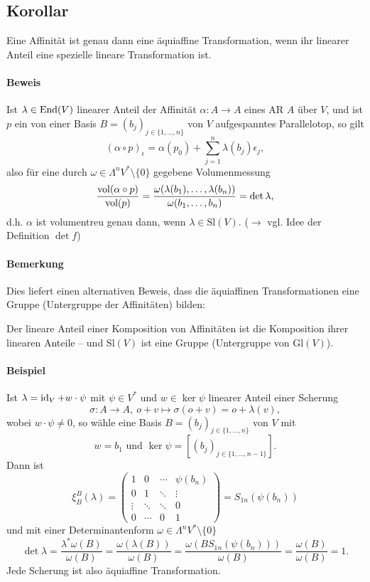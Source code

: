  \subsection{Korollar}
 	Eine Affinität ist genau dann eine äquiaffine Transformation, wenn ihr linearer Anteil eine spezielle lineare Transformation ist.
 	\paragraph{Beweis}
 		Ist $ \lambda \in \operatorname{End}(V) $ linearer Anteil der Affinität $ \alpha:A\to A $ eines AR $ A  $ über $ V $, und ist $ p $ ein von einer Basis $ B=(b_j)_{j\in \{1,\dots,n\}} $ von $ V $ aufgespanntes Parallelotop, so gilt
 		\[
 			(\alpha\circ p)_\epsilon = \alpha(p_0)+\sum_{j=1}^{n}\lambda(b_j)\epsilon_j,
 		\]
 		also für eine durch $ \omega\in \Lambda^nV^*\setminus \{0\} $ gegebene Volumenmessung
 		\[
 			\frac{\operatorname{vol}(\alpha\circ p)}{\operatorname{vol}(p)} = \frac{\omega(\lambda(b_1),\dots,\lambda(b_n))}{\omega(b_1,\dots,b_n)}=\det \lambda,
 		\]
 		d.h. $ \alpha $ ist volumentreu genau dann, wenn $ \lambda \in \mathrm{Sl}(V) $. ($ \rightarrow $ vgl. Idee der Definition $ \det f $)
 	\paragraph{Bemerkung}
 		Dies liefert einen alternativen Beweis, dass die äquiaffinen Transformationen eine Gruppe (Untergruppe der Affinitäten) bilden:

 		Der lineare Anteil einer Komposition von Affinitäten ist die Komposition ihrer linearen Anteile -- und $ \mathrm{Sl}(V) $ ist eine Gruppe (Untergruppe von $ \mathrm{Gl}(V) $).
 	\paragraph{Beispiel}
 		Ist $ \lambda = \operatorname{id}_V + w\cdot \psi $ mit $ \psi\in V^* $ und $ w\in \ker \psi $ linearer Anteil einer Scherung
 		\[
 			\sigma:A\to A,\ o+v\mapsto \sigma(o+v) = o+\lambda(v),
 		\]
 		wobei $ w\cdot\psi\neq 0 $, so wähle eine Basis $ B = (b_j)_{j\in\{1,\dots,n\}}$ von $ V $ mit
 		\[
 			w=b_1 \text{ und }  \ker \psi = [(b_j)_{j\in \{1,\dots,n-1\}}].
 		\]
 		Dann ist
 		\[
 			\xi_B^B(\lambda) =
 			\begin{pmatrix}
 				1      & 0      & \cdots & \psi(b_n) \\
 				0      & 1      & \ddots & \vdots    \\
 				\vdots & \ddots & \ddots & 0         \\
 				0      & \cdots & 0      & 1
 			\end{pmatrix}
 			= S_{1n}(\psi(b_n))
 		\]
 		und mit einer Determinantenform $ \omega\in \Lambda^nV^*\setminus\{0\} $
 		\[
 			\det \lambda = \frac{\lambda^*\omega(B)}{\omega(B)} = \frac{\omega(\lambda(B))}{\omega(B)} = \frac{\omega(BS_{1n}(\psi(b_n)))}{\omega(B)} = \frac{\omega(B)}{\omega(B)} = 1.
 		\]
 		Jede Scherung ist also äquiaffine Transformation.

